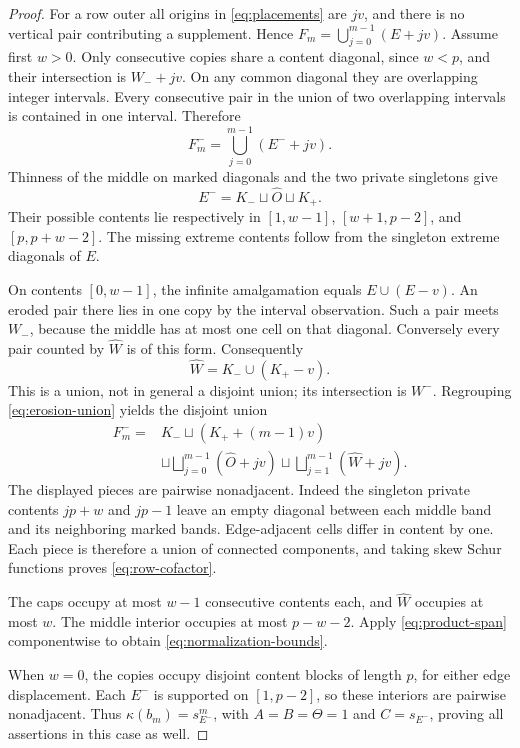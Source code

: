 \documentclass[11pt,a4paper]{amsart}
\numberwithin{equation}{section}
\theoremstyle{plain}
\theoremstyle{definition}
\begin{document}
\begin{proof}
For a row outer all origins in \eqref{eq:placements} are \(jv\), and there is no vertical pair contributing a supplement.  Hence
\(F_m=\bigcup_{j=0}^{m-1}(E+jv)\).
Assume first \(w>0\).  Only consecutive copies share a content diagonal, since \(w<p\), and their intersection is \(W_-+jv\).  On any common diagonal they are overlapping integer intervals.  Every consecutive pair in the union of two overlapping intervals is contained in one interval.  Therefore
\begin{equation}\label{eq:erosion-union}
 F_m^-=\bigcup_{j=0}^{m-1}(E^-+jv).
\end{equation}
Thinness of the middle on marked diagonals and the two private singletons give
\begin{equation*}
 E^-=K_-\sqcup\widehat O\sqcup K_+.
\end{equation*}
Their possible contents lie respectively in \([1,w-1]\), \([w+1,p-2]\), and \([p,p+w-2]\).  The missing extreme contents follow from the singleton extreme diagonals of \(E\).

On contents \([0,w-1]\), the infinite amalgamation equals \(E\cup(E-v)\).  An eroded pair there lies in one copy by the interval observation.  Such a pair meets \(W_-\), because the middle has at most one cell on that diagonal.  Conversely every pair counted by \(\widehat W\) is of this form.  Consequently
\begin{equation}\label{eq:cap-hat}
 \widehat W=K_-\cup(K_+-v).
\end{equation}
This is a union, not in general a disjoint union; its intersection is \(W^-\).
Regrouping \eqref{eq:erosion-union} yields the disjoint union
\begin{equation*}
 \begin{split}
 F_m^-={}&K_-\sqcup(K_++(m-1)v)\\
 &\sqcup\bigsqcup_{j=0}^{m-1}(\widehat O+jv)
 \sqcup\bigsqcup_{j=1}^{m-1}(\widehat W+jv).
 \end{split}
\end{equation*}
The displayed pieces are pairwise nonadjacent.  Indeed the singleton private contents \(jp+w\) and \(jp-1\) leave an empty diagonal between each middle band and its neighboring marked bands.  Edge-adjacent cells differ in content by one.  Each piece is therefore a union of connected components, and taking skew Schur functions proves \eqref{eq:row-cofactor}.

The caps occupy at most \(w-1\) consecutive contents each, and \(\widehat W\) occupies at most \(w\).  The middle interior occupies at most \(p-w-2\).  Apply \eqref{eq:product-span} componentwise to obtain \eqref{eq:normalization-bounds}.

When \(w=0\), the copies occupy disjoint content blocks of length \(p\), for either edge displacement.  Each \(E^-\) is supported on \([1,p-2]\), so these interiors are pairwise nonadjacent.  Thus \(\kappa(b_m)=s_{E^-}^m\), with \(A=B=\Theta=1\) and \(C=s_{E^-}\), proving all assertions in this case as well.
\end{proof}
\end{document}
